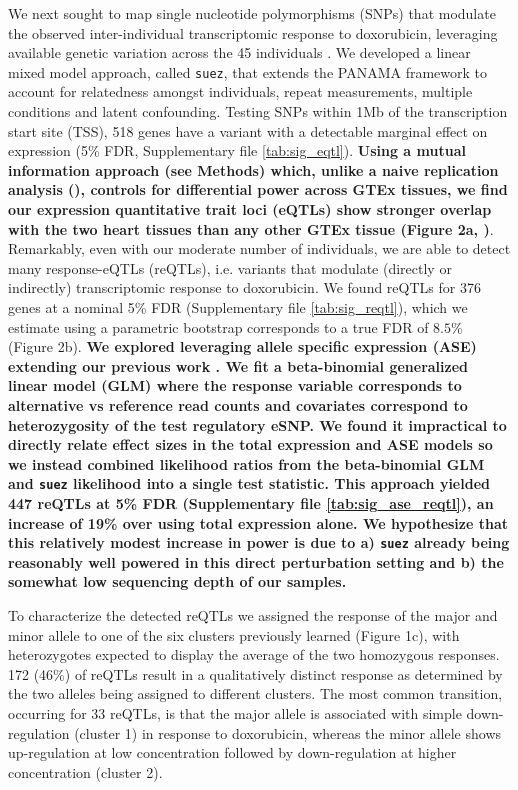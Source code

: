 \documentclass[9pt,lineno]{elife}
\newcommand{\tempbold}[1]{\textbf{#1}}
\begin{document}
We next sought to map single nucleotide polymorphisms (SNPs) that modulate the observed inter-individual transcriptomic response to doxorubicin, leveraging available genetic variation across the 45 individuals \citep{Livne2015}. We developed a linear mixed model approach, called \texttt{suez}, that extends the PANAMA framework\citep{Fusi2012} to account for relatedness amongst individuals, repeat measurements, multiple conditions and latent confounding. Testing SNPs within 1Mb of the transcription start site (TSS), 518 genes have a variant with a detectable marginal effect on expression (5\% FDR, Supplementary file \ref{tab:sig_eqtl}). \tempbold{Using a mutual information approach (see Methods) which, unlike a naive replication analysis (\FIGSUPP[fig2]{gtex_pi0}), controls for differential power across GTEx tissues, we find our expression quantitative trait loci (eQTLs) show stronger overlap with the two heart tissues than any other GTEx tissue (Figure 2a, \FIGSUPP[fig2]{gtex_mi})}. Remarkably, even with our moderate number of individuals, we are able to detect many response-eQTLs (reQTLs), i.e. variants that modulate (directly or indirectly) transcriptomic response to doxorubicin. We found reQTLs for 376 genes at a nominal 5\% FDR (Supplementary file \ref{tab:sig_reqtl}), which we estimate using a parametric bootstrap corresponds to a true FDR of $8.5\%$ (Figure 2b). \tempbold{We explored leveraging allele specific expression (ASE) extending our previous work \citep{Knowles2017-yp,Van_de_Geijn2015-nm}. We fit a beta-binomial generalized linear model (GLM) where the response variable corresponds to alternative vs reference read counts and covariates correspond to heterozygosity of the test regulatory eSNP. We found it impractical to directly relate effect sizes in the total expression and ASE models so we instead combined likelihood ratios from the beta-binomial GLM and \texttt{suez} likelihood into a single test statistic. This approach yielded 447 reQTLs at 5\% FDR (Supplementary file \ref{tab:sig_ase_reqtl}), an increase of 19\% over using total expression alone. We hypothesize that this relatively modest increase in power is due to a) \texttt{suez} already being reasonably well powered in this direct perturbation setting and b) the somewhat low sequencing depth of our samples.}

To characterize the detected reQTLs we assigned the response of the major and minor allele to one of the six clusters previously learned (Figure 1c), with heterozygotes expected to display the average of the two homozygous responses. 172 (46\%) of reQTLs result in a qualitatively distinct response as determined by the two alleles being assigned to different clusters. The most common transition, occurring for 33 reQTLs, is that the major allele is associated with simple down-regulation (cluster 1) in response to doxorubicin, whereas the minor allele shows up-regulation at low concentration followed by down-regulation at higher concentration (cluster 2). 
\end{document}

